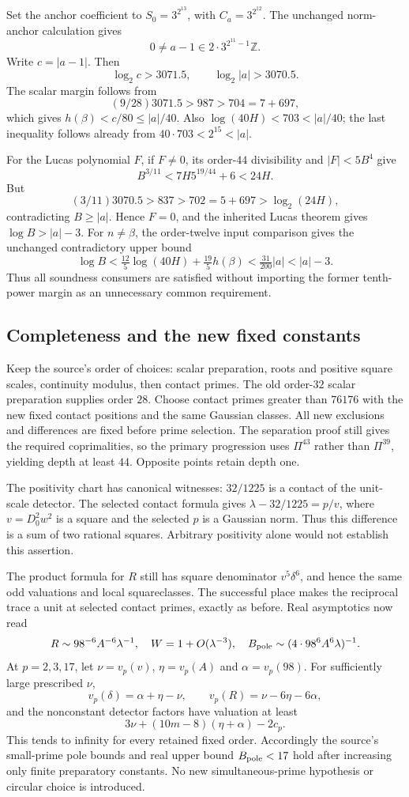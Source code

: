 Set the anchor coefficient to $S_0=3^{2^{13}}$, with
$C_a=3^{2^{12}}$. The unchanged norm-anchor calculation gives
\[
 0\ne a-1\in2\cdot3^{2^{11}-1}\mathbb Z.
\]
Write $c=|a-1|$. Then
\[
 \log_2c>3071.5,\qquad\log_2|a|>3070.5.
\]
The scalar margin follows from
\[
 (9/28)3071.5>987>704=7+697,
\]
which gives $h(\beta)<c/80\le|a|/40$.
Also $\log(40H)<703<|a|/40$; the last inequality follows already
from $40\cdot703<2^{15}<|a|$.

For the Lucas polynomial $F$, if $F\ne0$, its order-$44$ divisibility
and $|F|<5B^4$ give
\[
 B^{3/11}<7H5^{19/44}+6<24H.
\]
But
\[
 (3/11)3070.5>837>702=5+697>\log_2(24H),
\]
contradicting $B\ge|a|$. Hence $F=0$, and the inherited Lucas theorem
gives $\log B>|a|-3$. For $n\ne\beta$, the order-twelve input comparison
gives the unchanged contradictory upper bound
\[
 \log B<\tfrac{12}{5}\log(40H)+\tfrac{19}{5}h(\beta)
 <\tfrac{31}{200}|a|<|a|-3.
\]
Thus all soundness consumers are satisfied without importing the former
tenth-power margin as an unnecessary common requirement.

\subsection{Completeness and the new fixed constants}

Keep the source's order of choices: scalar preparation, roots and positive
square scales, continuity modulus, then contact primes. The old order-$32$
scalar preparation supplies order $28$. Choose contact primes greater than
$76176$ with the new fixed contact positions and the same Gaussian classes.
All new exclusions and differences are fixed before prime selection.
The separation proof still gives the required coprimalities, so the primary
progression uses $\Pi^{43}$ rather than $\Pi^{39}$, yielding depth at
least $44$. Opposite points retain depth one.

The positivity chart has canonical witnesses: $32/1225$ is a contact of
the unit-scale detector. The selected contact formula gives
$\lambda-32/1225=p/v$, where $v=D_0^2w^2$ is a square and the selected
$p$ is a Gaussian norm. Thus this difference is a sum of two rational
squares. Arbitrary positivity alone would not establish this assertion.

The product formula for $R$ still has square denominator $v^5\delta^6$,
and hence the same odd valuations and local squareclasses. The successful
place makes the reciprocal trace a unit at selected contact primes, exactly
as before. Real asymptotics now read
\[
 R\sim98^{-6}A^{-6}\lambda^{-1},\quad W=1+O(\lambda^{-3}),
 \quad B_{\rm pole}\sim(4\cdot98^6A^6\lambda)^{-1}.
\]
At $p=2,3,17$, let $\nu=v_p(v)$, $\eta=v_p(A)$ and
$\alpha=v_p(98)$. For sufficiently large prescribed $\nu$,
\[
 v_p(\delta)=\alpha+\eta-\nu,\qquad
 v_p(R)=\nu-6\eta-6\alpha,
\]
and the nonconstant detector factors have valuation at least
\[
 3\nu+(10m-8)(\eta+\alpha)-2c_p.
\]
This tends to infinity for every retained fixed order. Accordingly the
source's small-prime pole bounds and real upper bound $B_{\rm pole}<17$
hold after increasing only finite preparatory constants. No new
simultaneous-prime hypothesis or circular choice is introduced.

